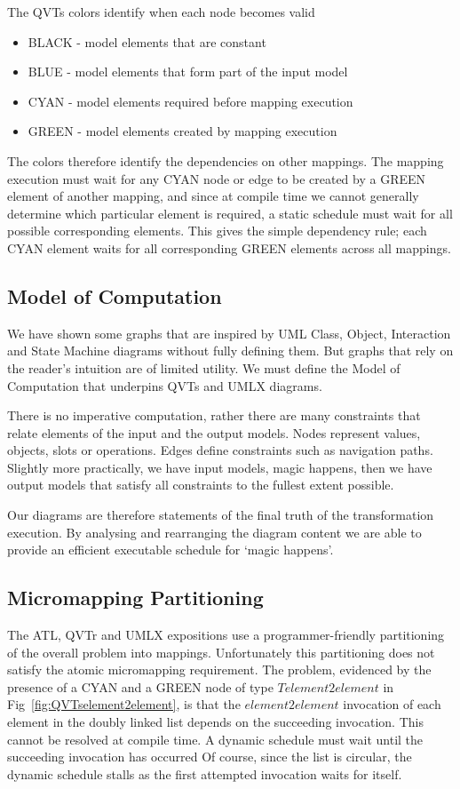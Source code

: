 \documentclass{llncs}
\begin{document}
The QVTs colors identify when each node becomes valid 
\begin{itemize}
	\item BLACK - model elements that are constant
	\item BLUE - model elements that form part of the input model
	\item CYAN - model elements required before mapping execution
	\item GREEN - model elements created by mapping execution
\end{itemize}

The colors therefore identify the dependencies on other mappings. The mapping execution must wait for any CYAN node or edge to be created by a GREEN element of another mapping, and since at compile time we cannot generally determine which particular element is required, a static schedule must wait for all possible corresponding elements. This gives the simple dependency rule; each CYAN element waits for all corresponding GREEN elements across all mappings.

\subsection{Model of Computation}

We have shown some graphs that are inspired by UML Class, Object, Interaction and State Machine diagrams without fully defining them. But graphs that rely on the reader's intuition are of limited utility. We must define the Model of Computation \cite{moc} that underpins QVTs and UMLX diagrams. 

There is no imperative computation, rather there are many constraints that relate elements of the input and the output models. Nodes represent values, objects, slots or operations. Edges define constraints such as navigation paths. Slightly more practically, we have input models, magic happens, then we have output models that satisfy all constraints to the fullest extent possible.

Our diagrams are therefore statements of the final truth of the transformation execution. By analysing and rearranging the diagram content we are able to provide an efficient executable schedule for `magic happens'.

\subsection{Micromapping Partitioning}

The ATL, QVTr and UMLX expositions use a programmer-friendly partitioning of the overall problem into mappings. Unfortunately this partitioning does not satisfy the atomic micromapping requirement. The problem, evidenced by the presence of a CYAN and a GREEN node of type $Telement2element$ in Fig~\ref{fig:QVTselement2element}, is that the $element2element$ invocation of each element in the doubly linked list depends on the succeeding invocation. This cannot be resolved at compile time. A dynamic schedule must wait until the succeeding invocation has occurred Of course, since the list is circular, the dynamic schedule stalls as the first attempted invocation waits for itself.
\end{document}
